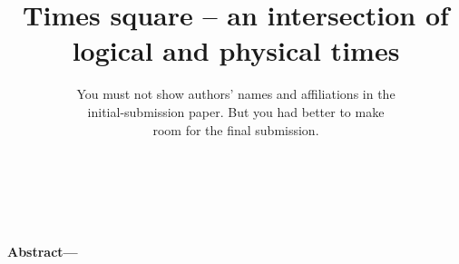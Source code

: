 \documentclass[twocolumn]{article}
\begin{document}
\date{}

\title{Times square -- an intersection of logical and physical times} %


\author{
You must not show authors' names and affiliations in the\\
initial-submission paper. But you had better to make \\
room for the final submission.\\
\\
\\
\\ %
}
\maketitle
\thispagestyle{empty}

{\small\textbf{Abstract---
 }}











\end{document}
